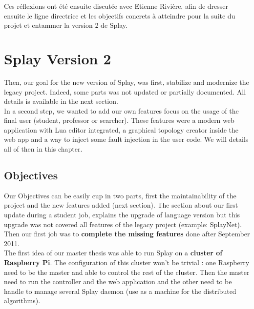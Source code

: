 \documentclass{eplmastersthesis}
\begin{document}
        Ces réflexions ont été ensuite discutée avec Etienne Rivière, afin de
        dresser ensuite le ligne directrice et les objectifs concrets à atteindre
        pour la suite du projet et entammer la version 2 de Splay.

  \chapter{Splay Version 2} %

    Then, our goal for the new version of Splay, was first, stabilize and
    modernize the legacy project. Indeed, some parts was not updated or
    partially documented. All details is available in the next section.\\

    In a second step, we wanted to add our own features focus on the usage of
    the final user (student, professor or searcher). These features were a
    modern web application with Lua editor integrated, a graphical topology
    creator inside the web app and a way to inject some fault injection in the
    user code. We will details all of then in this chapter.

    \section{Objectives} %

      Our Objectives can be easily cup in two parts, first the maintainability
      of the project and the new features added (next section). The section
      about our first update during a student job, explains the upgrade of
      language version but this upgrade was not covered all features of the
      legacy project (example: SplayNet). Then our first job was to
      \textbf{complete the missing features} done after  September 2011.\\

      The first idea of our master thesis was able to run Splay on a
      \textbf{cluster of Raspberry Pi}. The configuration of this cluster won't
      be trivial : one Raspberry need to be the master and able to control the
      rest of the cluster. Then the master need to run the controller and the
      web application and the other need to be handle to manage several Splay
      daemon (use as a machine for the distributed algorithms). \\
\end{document}
